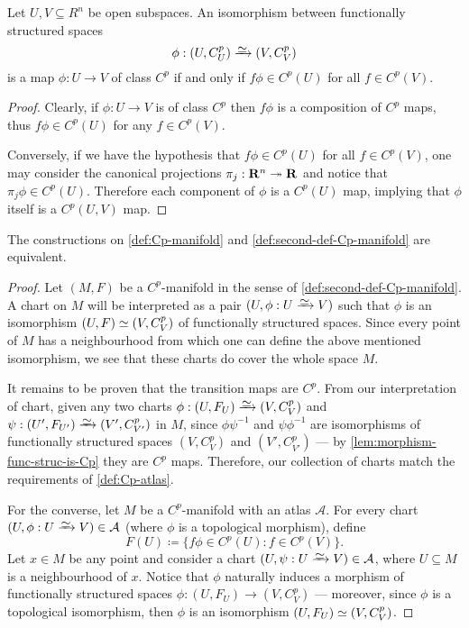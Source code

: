 \begin{lemma}
    \label{lem:morphism-func-struc-is-Cp}
    Let \(U, V \subseteq R^n\) be open subspaces. An isomorphism between
    functionally structured spaces
    \[
        \phi: (U, C_U^p) \isoto (V, C_V^p)
    \]
    is a map \(\phi: U \to V\) of class \(C^p\) if and only if \(f \phi \in C^p(U)\)
    for all \(f \in C^p(V)\).
\end{lemma}

\begin{proof}
    Clearly, if \(\phi: U \to V\) is of class \(C^p\) then \(f \phi\) is a
    composition of \(C^p\) maps, thus \(f \phi \in C^p(U)\) for any \(f \in
    C^p(V)\).

    Conversely, if we have the hypothesis that \(f \phi \in C^p(U)\) for all
    \(f \in C^p(V)\), one may consider the canonical projections
    \(\pi_j: \mathbf{R}^n \twoheadrightarrow \mathbf{R}\) and notice that \(\pi_j \phi \in C^p(U)\). Therefore
    each component of \(\phi\) is a \(C^p(U)\) map, implying that \(\phi\) itself is
    a \(C^p(U, V)\) map.
\end{proof}

\begin{lemma}
    \label{lem:equivalence-def-Cp-man}
    The constructions on \cref{def:Cp-manifold} and
    \cref{def:second-def-Cp-manifold} are equivalent.
\end{lemma}

\begin{proof}
    Let \((M, F)\) be a \(C^p\)-manifold in the sense of
    \cref{def:second-def-Cp-manifold}. A chart on \(M\) will be interpreted as a
    pair \((U, \phi: U \isoto V)\) such that \(\phi\) is an isomorphism
    \((U, F) \simeq (V, C_V^p)\) of functionally structured spaces. Since every point
    of \(M\) has a neighbourhood from which one can define the above mentioned
    isomorphism, we see that these charts do cover the whole space \(M\).

    It remains to be proven that the transition maps are \(C^p\). From our
    interpretation of chart, given any two charts
    \(\phi: (U, F_U) \isoto (V, C_V^p)\) and
    \(\psi: (U', F_{U'}) \isoto (V', C_{V'}^p)\) in \(M\), since \(\phi \psi^{-1}\)
    and \(\psi \phi^{-1}\) are isomorphisms of functionally structured spaces
    \((V, C_V^p)\) and \((V', C_{V'}^p)\) --- by \cref{lem:morphism-func-struc-is-Cp}
    they are \(C^p\) maps. Therefore, our collection of charts match the
    requirements of \cref{def:Cp-atlas}.

    For the converse, let \(M\) be a \(C^p\)-manifold with an atlas
    \(\mathcal{A}\). For every chart \((U, \phi: U \isoto V) \in \mathcal{A}\)
    (where \(\phi\) is a topological morphism), define
    \[
        F(U) \coloneq \{f \phi \in C^{p}(U) \colon f \in C^p(V)\}.
    \]
    Let \(x \in M\) be any point and consider a chart \((U, \psi: U \isoto V)
    \in \mathcal{A}\), where \(U \subseteq M\) is a neighbourhood of \(x\). Notice
    that \(\phi\) naturally induces a morphism of functionally structured spaces
    \(\phi: (U, F_U) \to (V, C_V^p)\) --- moreover, since \(\phi\) is a topological
    isomorphism, then \(\phi\) is an isomorphism \((U, F_U) \simeq (V, C_V^p)\).
\end{proof}

